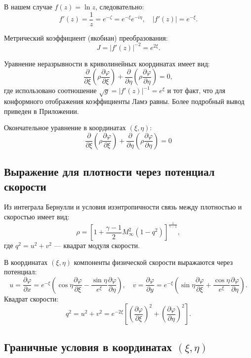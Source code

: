 \documentclass[a4paper,12pt]{article}
\begin{document}
	В нашем случае $f(z) = \ln z$, следовательно:
	\[
	f'(z) = \frac{1}{z} = e^{-\zeta} = e^{-\xi} e^{-i\eta}, \quad |f'(z)| = e^{-\xi}.
	\]
	
	Метрический коэффициент (якобиан) преобразования:
	\[
	J = |f'(z)|^{-2} = e^{2\xi}.
	\]
	
	Уравнение неразрывности в криволинейных координатах имеет вид:
	\[
	\frac{\partial}{\partial \xi} \left( \rho \frac{\partial \varphi}{\partial \xi} \right) + \frac{\partial}{\partial \eta} \left( \rho \frac{\partial \varphi}{\partial \eta} \right) = 0,
	\]
	где использовано соотношение $\sqrt{g} = |f'(z)|^{-1} = e^{\xi}$ и тот факт, что для конформного отображения коэффициенты Ламэ равны. Более подробный вывод приведен в Приложении.
	
	Окончательное уравнение в координатах $(\xi, \eta)$:
	\begin{equation}
		\boxed{\frac{\partial}{\partial \xi} \left( \rho \frac{\partial \varphi}{\partial \xi} \right) + \frac{\partial}{\partial \eta} \left( \rho \frac{\partial \varphi}{\partial \eta} \right) = 0}
	\end{equation}
	
	\subsection{Выражение для плотности через потенциал скорости}
	Из интеграла Бернулли и условия изэнтропичности связь между плотностью и скоростью имеет вид:
	\[
	\rho = \left[ 1 + \frac{\gamma-1}{2} M_\infty^2 \left( 1 - q^2 \right) \right]^{\frac{1}{\gamma-1}},
	\]
	где $q^2 = u^2 + v^2$ — квадрат модуля скорости.
	
	В координатах $(\xi, \eta)$ компоненты физической скорости выражаются через потенциал:
	\[
	u = \frac{\partial \varphi}{\partial x} = e^{-\xi} \left( \cos\eta \frac{\partial \varphi}{\partial \xi} - \frac{\sin\eta}{e^{\xi}} \frac{\partial \varphi}{\partial \eta} \right), \quad
	v = \frac{\partial \varphi}{\partial y} = e^{-\xi} \left( \sin\eta \frac{\partial \varphi}{\partial \xi} + \frac{\cos\eta}{e^{\xi}} \frac{\partial \varphi}{\partial \eta} \right).
	\]
	Квадрат скорости:
	\[
	q^2 = u^2 + v^2 = e^{-2\xi} \left[ \left( \frac{\partial \varphi}{\partial \xi} \right)^2 + \left( \frac{\partial \varphi}{\partial \eta} \right)^2 \right].
	\]
	
	\subsection{Граничные условия в координатах $(\xi, \eta)$}
	
\end{document}
